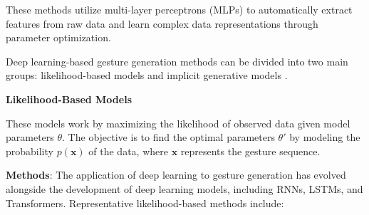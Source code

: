 These methods utilize multi-layer perceptrons (MLPs) to automatically extract features from raw data and learn complex data representations through parameter optimization.


Deep learning-based gesture generation methods can be divided into two main groups: likelihood-based models and implicit generative models \cite{song2021score}.


\textbf{Likelihood-Based Models}

These models work by maximizing the likelihood of observed data given model parameters $\theta$. The objective is to find the optimal parameters $\theta'$ by modeling the probability $p(\mathbf{x})$ of the data, where $\mathbf{x}$ represents the gesture sequence.


\textbf{Methods}: The application of deep learning to gesture generation has evolved alongside the development of deep learning models, including RNNs, LSTMs, and Transformers. Representative likelihood-based methods include:

